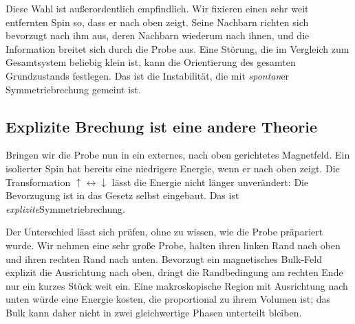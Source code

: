 Diese Wahl ist außerordentlich empfindlich. Wir fixieren einen sehr weit entfernten Spin so, dass er nach oben zeigt. Seine Nachbarn richten sich bevorzugt nach ihm aus, deren Nachbarn wiederum nach ihnen, und die Information breitet sich durch die Probe aus. Eine Störung, die im Vergleich zum Gesamtsystem beliebig klein ist, kann die Orientierung des gesamten Grundzustands festlegen. Das ist die Instabilität, die mit \emph{spontan}er Symmetriebrechung gemeint ist.

\begin{classroomqa}
\end{classroomqa}

\begin{classroomqa}
\end{classroomqa}

\subsection{Explizite Brechung ist eine andere Theorie}

Bringen wir die Probe nun in ein externes, nach oben gerichtetes Magnetfeld. Ein isolierter Spin hat bereits eine niedrigere Energie, wenn er nach oben zeigt. Die Transformation \(\uparrow\leftrightarrow\downarrow\) lässt die Energie nicht länger unverändert: Die Bevorzugung ist in das Gesetz selbst eingebaut. Das ist \emph{explizite}Symmetriebrechung.

Der Unterschied lässt sich prüfen, ohne zu wissen, wie die Probe präpariert wurde. Wir nehmen eine sehr große Probe, halten ihren linken Rand nach oben und ihren rechten Rand nach unten. Bevorzugt ein magnetisches Bulk-Feld explizit die Ausrichtung nach oben, dringt die Randbedingung am rechten Ende nur ein kurzes Stück weit ein. Eine makroskopische Region mit Ausrichtung nach unten würde eine Energie kosten, die proportional zu ihrem Volumen ist; das Bulk kann daher nicht in zwei gleichwertige Phasen unterteilt bleiben.

